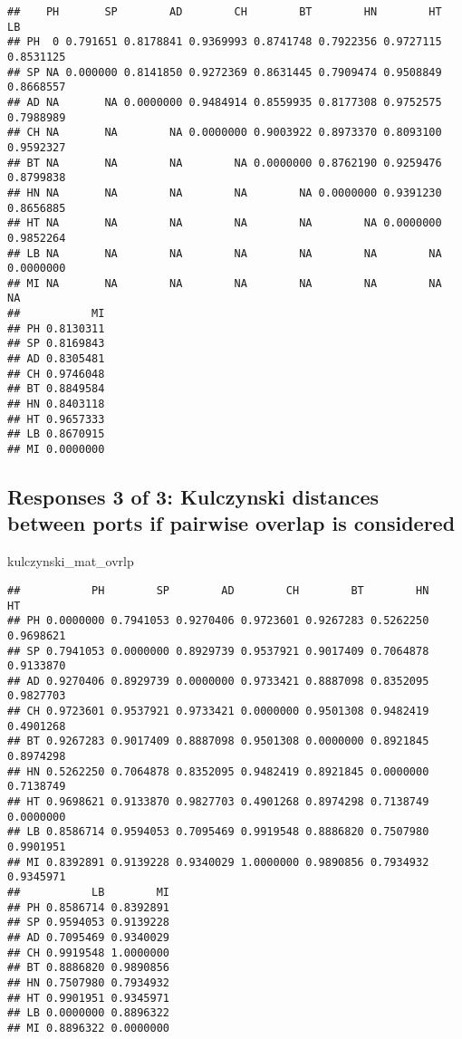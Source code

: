 \documentclass[]{article}
\newenvironment{Shaded}{\begin{snugshade}}{\end{snugshade}}
\newcommand{\NormalTok}[1]{#1}
\begin{document}
\begin{verbatim}
##    PH       SP        AD        CH        BT        HN        HT        LB
## PH  0 0.791651 0.8178841 0.9369993 0.8741748 0.7922356 0.9727115 0.8531125
## SP NA 0.000000 0.8141850 0.9272369 0.8631445 0.7909474 0.9508849 0.8668557
## AD NA       NA 0.0000000 0.9484914 0.8559935 0.8177308 0.9752575 0.7988989
## CH NA       NA        NA 0.0000000 0.9003922 0.8973370 0.8093100 0.9592327
## BT NA       NA        NA        NA 0.0000000 0.8762190 0.9259476 0.8799838
## HN NA       NA        NA        NA        NA 0.0000000 0.9391230 0.8656885
## HT NA       NA        NA        NA        NA        NA 0.0000000 0.9852264
## LB NA       NA        NA        NA        NA        NA        NA 0.0000000
## MI NA       NA        NA        NA        NA        NA        NA        NA
##           MI
## PH 0.8130311
## SP 0.8169843
## AD 0.8305481
## CH 0.9746048
## BT 0.8849584
## HN 0.8403118
## HT 0.9657333
## LB 0.8670915
## MI 0.0000000
\end{verbatim}

\subsection{Responses 3 of 3: Kulczynski distances between ports if
pairwise overlap is
considered}\label{responses-3-of-3-kulczynski-distances-between-ports-if-pairwise-overlap-is-considered-1}

\begin{Shaded}
\begin{Highlighting}[]
\NormalTok{kulczynski_mat_ovrlp}
\end{Highlighting}
\end{Shaded}

\begin{verbatim}
##           PH        SP        AD        CH        BT        HN        HT
## PH 0.0000000 0.7941053 0.9270406 0.9723601 0.9267283 0.5262250 0.9698621
## SP 0.7941053 0.0000000 0.8929739 0.9537921 0.9017409 0.7064878 0.9133870
## AD 0.9270406 0.8929739 0.0000000 0.9733421 0.8887098 0.8352095 0.9827703
## CH 0.9723601 0.9537921 0.9733421 0.0000000 0.9501308 0.9482419 0.4901268
## BT 0.9267283 0.9017409 0.8887098 0.9501308 0.0000000 0.8921845 0.8974298
## HN 0.5262250 0.7064878 0.8352095 0.9482419 0.8921845 0.0000000 0.7138749
## HT 0.9698621 0.9133870 0.9827703 0.4901268 0.8974298 0.7138749 0.0000000
## LB 0.8586714 0.9594053 0.7095469 0.9919548 0.8886820 0.7507980 0.9901951
## MI 0.8392891 0.9139228 0.9340029 1.0000000 0.9890856 0.7934932 0.9345971
##           LB        MI
## PH 0.8586714 0.8392891
## SP 0.9594053 0.9139228
## AD 0.7095469 0.9340029
## CH 0.9919548 1.0000000
## BT 0.8886820 0.9890856
## HN 0.7507980 0.7934932
## HT 0.9901951 0.9345971
## LB 0.0000000 0.8896322
## MI 0.8896322 0.0000000
\end{verbatim}
\end{document}
